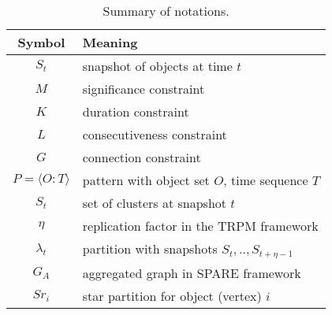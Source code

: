 \begin{table}[h]
\centering
\begin{tabular}{|c|l|} 
\hline
\textbf{Symbol} & \textbf{Meaning} \\
\hline
$S_t$ & snapshot of objects at time $t$ \\
\hline
$M$ & significance constraint \\
\hline 
$K$ & duration constraint\\
\hline
$L$ & consecutiveness constraint\\
\hline
$G$ & connection constraint \\
\hline
$P=\langle O:T \rangle$ & pattern with object set $O$, time sequence $T$\\
\hline
$S_t$ & set of clusters at snapshot $t$\\
\hline
$\eta$ & replication factor in the TRPM framework\\
\hline 
$\lambda_t$ & partition with snapshots $S_t,..,S_{t+\eta-1}$ \\
\hline
$G_A$ & aggregated graph in SPARE framework\\
\hline
$Sr_i $ &  star partition for object (vertex) $i$ \\
\hline 
\end{tabular} 
\caption{Summary of notations.}
\end{table}